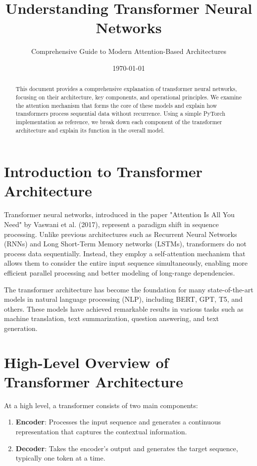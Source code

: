 \documentclass{article}
\title{Understanding Transformer Neural Networks}
\author{Comprehensive Guide to Modern Attention-Based Architectures}
\date{\today}
\begin{document}
\maketitle

\begin{abstract}
This document provides a comprehensive explanation of transformer neural networks, focusing on their architecture, key components, and operational principles. We examine the attention mechanism that forms the core of these models and explain how transformers process sequential data without recurrence. Using a simple PyTorch implementation as reference, we break down each component of the transformer architecture and explain its function in the overall model.
\end{abstract}

\tableofcontents

\section{Introduction to Transformer Architecture}

Transformer neural networks, introduced in the paper "Attention Is All You Need" by Vaswani et al. (2017), represent a paradigm shift in sequence processing. Unlike previous architectures such as Recurrent Neural Networks (RNNs) and Long Short-Term Memory networks (LSTMs), transformers do not process data sequentially. Instead, they employ a self-attention mechanism that allows them to consider the entire input sequence simultaneously, enabling more efficient parallel processing and better modeling of long-range dependencies.

The transformer architecture has become the foundation for many state-of-the-art models in natural language processing (NLP), including BERT, GPT, T5, and others. These models have achieved remarkable results in various tasks such as machine translation, text summarization, question answering, and text generation.

\section{High-Level Overview of Transformer Architecture}

At a high level, a transformer consists of two main components:

\begin{enumerate}
    \item \textbf{Encoder}: Processes the input sequence and generates a continuous representation that captures the contextual information.
    \item \textbf{Decoder}: Takes the encoder's output and generates the target sequence, typically one token at a time.
\end{enumerate}
\end{document}
